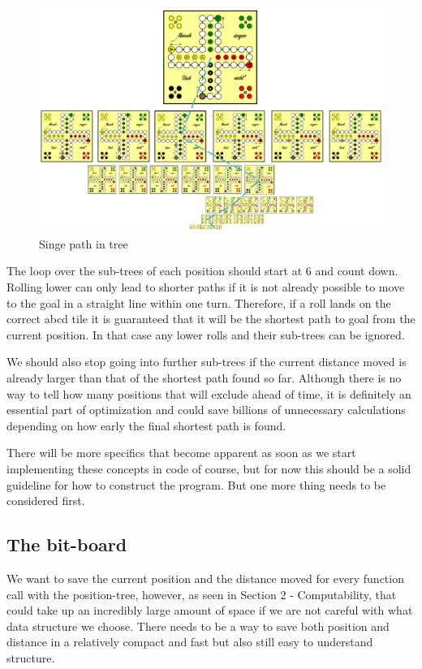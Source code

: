 \documentclass[12pt]{article} %
\begin{document}
\begin{figure}[htbp]
    \centering
    \includegraphics[width=1\textwidth]{images/Figure5}
    \caption{Singe path in tree}
    \label{fig:pathintree}
\end{figure}

The loop over the sub-trees of each position should start at 6 and count down. Rolling lower can only lead to shorter paths if it is not already possible to move to the goal in a straight line within one turn. Therefore, if a roll lands on the correct abcd tile it is guaranteed that it will be the shortest path to goal from the current position. In that case any lower rolls and their sub-trees can be ignored.

We should also stop going into further sub-trees if the current distance moved is already larger than that of the shortest path found so far. Although there is no way to tell how many positions that will exclude ahead of time, it is definitely an essential part of optimization and could save billions of unnecessary calculations depending on how early the final shortest path is found.

There will be more specifics that become apparent as soon as we start implementing these concepts in code of course, but for now this should be a solid guideline for how to construct the program. But one more thing needs to be considered first.

\subsection{The bit-board}
We want to save the current position and the distance moved for every function call with the position-tree, however, as seen in Section 2 - Computability, that could take up an incredibly large amount of space if we are not careful with what data structure we choose.
There needs to be a way to save both position and distance in a relatively compact and fast but also still easy to understand structure.
\end{document}
